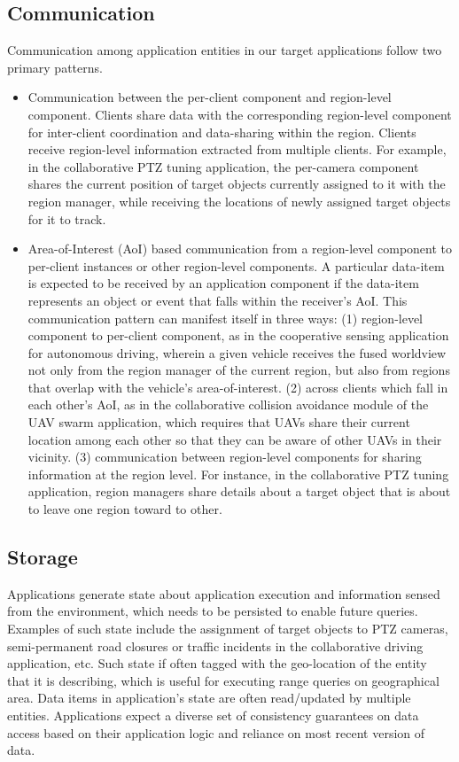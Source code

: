 \subsection{Communication}
\label{sec:app_model_comm}
Communication among application entities in our target applications follow two primary patterns.
\begin{itemize}
\item Communication between the per-client component and region-level component. Clients share data with the corresponding region-level component for inter-client coordination and data-sharing within the region. Clients receive region-level information extracted from multiple clients. For example, in the collaborative PTZ tuning application, the per-camera component shares the current position of target objects currently assigned to it with the region manager, while receiving the locations of newly assigned target objects for it to track.
\item Area-of-Interest (AoI) based communication from a region-level component to per-client instances or other region-level components. A particular data-item is expected to be received by an application component if the data-item represents an object or event that falls within the receiver's AoI. This communication pattern can manifest itself in three ways: (1) region-level component to per-client component, as in the cooperative sensing application for autonomous driving, wherein a given vehicle receives the fused worldview not only from the region manager of the current region, but also from regions that overlap with the vehicle's area-of-interest. (2) across clients which fall in each other's AoI, as in the collaborative collision avoidance module of the UAV swarm application, which requires that UAVs share their current location among each other so that they can be aware of other UAVs in their vicinity. (3) communication between region-level components for sharing information at the region level. For instance, in the collaborative PTZ tuning application, region managers share details about a target object that is about to leave one region toward to other.
\end{itemize}
\subsection{Storage}
Applications generate state about application execution and information sensed from the environment, which needs to be persisted to enable future queries. Examples of such state include the assignment of target objects to PTZ cameras, semi-permanent road closures or traffic incidents in the collaborative driving application, etc. Such state if often tagged with the geo-location of the entity that it is describing, which is useful for executing range queries on geographical area. Data items in application's state are often read/updated by multiple entities. Applications expect a diverse set of  consistency guarantees on data access based on their application logic and reliance on most recent version of data.

